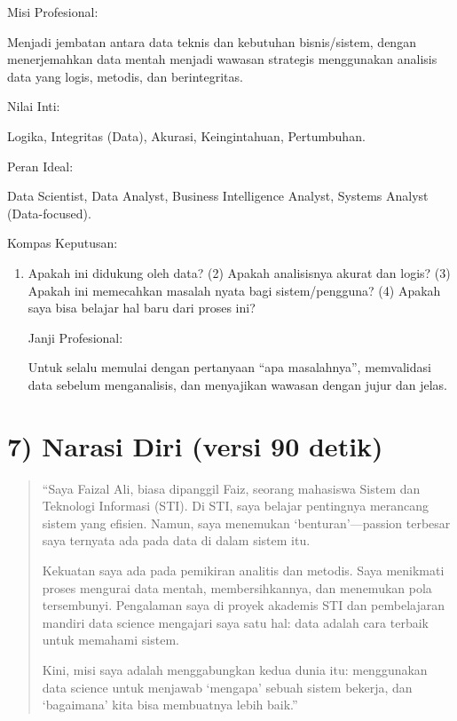\documentclass[
  letterpaper,
  DIV=11,
  numbers=noendperiod]{scrreprt}
\providecommand{\tightlist}{%
  \setlength{\itemsep}{0pt}\setlength{\parskip}{0pt}}
\begin{document}
Misi Profesional:

Menjadi jembatan antara data teknis dan kebutuhan bisnis/sistem, dengan
menerjemahkan data mentah menjadi wawasan strategis menggunakan analisis
data yang logis, metodis, dan berintegritas.

Nilai Inti:

Logika, Integritas (Data), Akurasi, Keingintahuan, Pertumbuhan.

Peran Ideal:

Data Scientist, Data Analyst, Business Intelligence Analyst, Systems
Analyst (Data-focused).

Kompas Keputusan:

\begin{enumerate}
\def\labelenumi{(\arabic{enumi})}
\tightlist
\item
  Apakah ini didukung oleh data? (2) Apakah analisisnya akurat dan
  logis? (3) Apakah ini memecahkan masalah nyata bagi sistem/pengguna?
  (4) Apakah saya bisa belajar hal baru dari proses ini?

  Janji Profesional:

  Untuk selalu memulai dengan pertanyaan ``apa masalahnya'', memvalidasi
  data sebelum menganalisis, dan menyajikan wawasan dengan jujur dan
  jelas.
\end{enumerate}

\section{7) Narasi Diri (versi 90
detik)}\label{narasi-diri-versi-90-detik}

\begin{quote}
``Saya Faizal Ali, biasa dipanggil Faiz, seorang mahasiswa Sistem dan
Teknologi Informasi (STI). Di STI, saya belajar pentingnya merancang
sistem yang efisien. Namun, saya menemukan `benturan'---passion terbesar
saya ternyata ada pada data di dalam sistem itu.

Kekuatan saya ada pada pemikiran analitis dan metodis. Saya menikmati
proses mengurai data mentah, membersihkannya, dan menemukan pola
tersembunyi. Pengalaman saya di proyek akademis STI dan pembelajaran
mandiri data science mengajari saya satu hal: data adalah cara terbaik
untuk memahami sistem.

Kini, misi saya adalah menggabungkan kedua dunia itu: menggunakan data
science untuk menjawab `mengapa' sebuah sistem bekerja, dan `bagaimana'
kita bisa membuatnya lebih baik.''
\end{quote}
\end{document}
